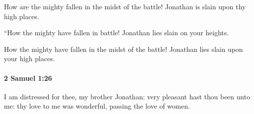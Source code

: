 			\begin{versebox}
					\item[BHS] 
					\item[ASV] How are the mighty fallen in the midst of the battle! Jonathan is slain upon thy high places.
					\item[NIV] “How the mighty have fallen in battle! Jonathan lies slain on your heights.
					\item[NRSV] How the mighty have fallen in the midst of the battle! Jonathan lies slain upon your high places.
			\end{versebox}

		\paragraph{2 Samuel 1:26} %
			\label{2SAMUEL-1-26}

			I am distressed for thee, my brother Jonathan: very pleasant hast thou been unto me: thy love to me was wonderful, passing the love of women.

